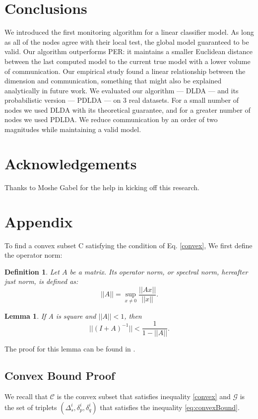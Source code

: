 \documentclass[11pt,twocolumn,varwidth=true,a4paper,fleqn]{article}
\newtheorem{lemma}{Lemma}
\newtheorem{definition}{Definition}
\begin{document}
\section*{Conclusions}
We introduced the first monitoring algorithm for a linear classifier model.
As long as all of the nodes agree with their local test, the
global model guaranteed to be valid. 
Our algorithm outperforms PER: it maintains a smaller Euclidean distance between 
the last computed model to the current true model with a lower volume of
communication. 
Our empirical study found a linear relationship between the dimension and
communication, something that might also be explained analytically 
in future work. 
We evaluated our algorithm --- DLDA --- and its probabilistic version --- PDLDA --- on 3 real datasets. For a small number of nodes we used 
DLDA with its theoretical guarantee, and for a greater number of nodes we used
PDLDA.
We reduce communication by an order of two magnitudes while maintaining a 
valid model.
 \section*{Acknowledgements}
Thanks to Moshe Gabel for the help in kicking off this research.




\appendix
\section{Appendix} \label{AppendixA}
To find a convex subset C satisfying the condition of Eq. \ref{convex},
We first define the operator norm:
\begin{definition}
Let $A$ be a matrix. Its operator norm, or
spectral norm, hereafter just norm, is defined as:
\begin{equation*}
||A|| = \sup_{x \neq 0}\frac{||Ax||}{||x||}.
\end{equation*}
\end{definition}

\begin{lemma} \label{lemma:newman}
If A is square and $||A|| < 1$, then
\begin{equation*}
||(I+A)^{-1}|| < \frac{1}{1-||A||}.
\end{equation*}
\end{lemma}
The proof for this lemma can be found in \cite{gabel2015monitoring}.

\subsection{Convex Bound Proof}
We recall that $\mathcal{C}$ is the convex subset that satisfies 
inequality \ref{convex} and $\mathcal{G}$ is the set of triplets 
$(\Delta_s^i, \delta_p^i, \delta_q^i)$
 that satisfies the inequality \ref{eq:convexBound}.
\end{document}
